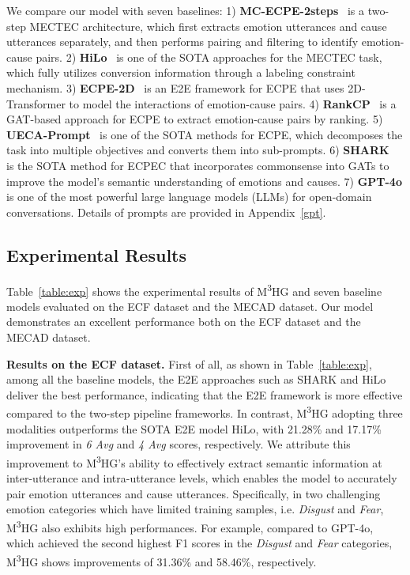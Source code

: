 \documentclass[11pt]{article}
\begin{document}
We compare our model with seven baselines:
1) \textbf{MC-ECPE-2steps}~\cite{ecf} is a two-step MECTEC architecture, which first extracts emotion utterances and cause utterances separately, and then performs pairing and filtering to identify emotion-cause pairs.
2) \textbf{HiLo}~\cite{li2024multimodal} is one of the SOTA approaches for the MECTEC task, which fully utilizes conversion information through a labeling constraint mechanism.
3) \textbf{ECPE-2D}~\cite{ECPE-2D} is an E2E framework for ECPE that uses 2D-Transformer to model the interactions of emotion-cause pairs.
4) \textbf{RankCP}~\cite{wei2020effective} is a GAT-based approach for ECPE to extract emotion-cause pairs by ranking.
5) \textbf{UECA-Prompt}~\cite{UECA-Prompt} is one of the SOTA methods for ECPE, which decomposes the task into multiple objectives and converts them into sub-prompts.
6) \textbf{SHARK}~\cite{wang2023generative} is the SOTA method for ECPEC that incorporates commonsense into GATs to improve the model's semantic understanding of emotions and causes.
7) \textbf{GPT-4o} is one of the most powerful large language models (LLMs) for open-domain conversations.
Details of prompts are provided in Appendix~\ref{gpt}.

\subsection{Experimental Results}
Table~\ref{table:exp} shows the experimental results of M\textsuperscript{3}HG and seven baseline models evaluated on the ECF dataset and the MECAD dataset.
Our model demonstrates an excellent performance both on the ECF dataset and the MECAD dataset.

\noindent\textbf{Results on the ECF dataset.} First of all, as shown in Table~\ref{table:exp}, among all the baseline models, the E2E approaches such as SHARK and HiLo deliver the best performance, indicating that the E2E framework is more effective compared to the two-step pipeline frameworks.
In contrast, M\textsuperscript{3}HG adopting three modalities outperforms the SOTA E2E model HiLo, with 21.28\% and 17.17\% improvement in \textit{6 Avg} and \textit{4 Avg} scores, respectively.
We attribute this improvement to M\textsuperscript{3}HG’s ability to effectively extract semantic information at inter-utterance and intra-utterance levels, which enables the model to accurately pair emotion utterances and cause utterances.
Specifically, in two challenging emotion categories which have limited training samples, i.e. \textit{Disgust} and \textit{Fear}, M\textsuperscript{3}HG also exhibits high performances.
For example, compared to GPT-4o, which achieved the second highest F1 scores in the \textit{Disgust} and \textit{Fear} categories, M\textsuperscript{3}HG shows improvements of 31.36\% and 58.46\%, respectively.
\end{document}
